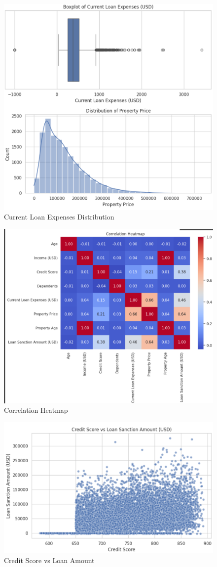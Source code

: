 \documentclass{article}
\begin{document}
\begin{figure}[H]
    \centering
    \includegraphics[width=0.5\linewidth]{current_loan.png}
    \caption{Current Loan Expenses Distribution}
    \label{fig:currentloan}
\end{figure}

\begin{figure}[H]
    \centering
    \includegraphics[width=0.5\linewidth]{heatmap.png}
    \caption{Correlation Heatmap}
    \label{fig:heatmap}
\end{figure}

\begin{figure}[H]
    \centering
    \includegraphics[width=0.8\linewidth]{cs_lmt.png}
    \caption{Credit Score vs Loan Amount}
    \label{fig:cs_lmt}
\end{figure}
\end{document}
